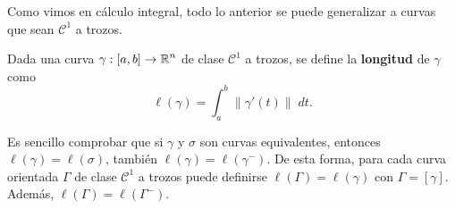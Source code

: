 Como vimos en cálculo integral, todo lo anterior se puede generalizar a curvas que sean $\displaystyle \mathcal{C}^{1} $ a trozos. 
\begin{definition}
	Dada una curva $\displaystyle \gamma : \left[a,b\right] \to \mathbb{R}^{n} $ de clase $\displaystyle \mathcal{C}^{1} $ a trozos, se define la \textbf{longitud} de $\displaystyle \gamma  $ como
	\[\ell\left(\gamma \right)=\int^{b}_{a} \|\gamma'\left(t\right)\| \; dt .\]
\end{definition}
Es sencillo comprobar que si $\displaystyle \gamma  $ y $\displaystyle \sigma  $ son curvas equivalentes, entonces $\displaystyle \ell\left(\gamma \right)=\ell\left(\sigma \right) $, también $\displaystyle \ell\left(\gamma \right)=\ell\left(\gamma^{-} \right) $. De esta forma, para cada curva orientada $\displaystyle \Gamma  $ de clase $\displaystyle \mathcal{C}^{1} $ a trozos puede definirse $\displaystyle \ell\left(\Gamma \right)=\ell\left(\gamma \right) $ con $\displaystyle \Gamma = \left[\gamma \right]  $. 
Además, $\displaystyle \ell\left(\Gamma \right)=\ell\left(\Gamma^{-}\right) $. \\


